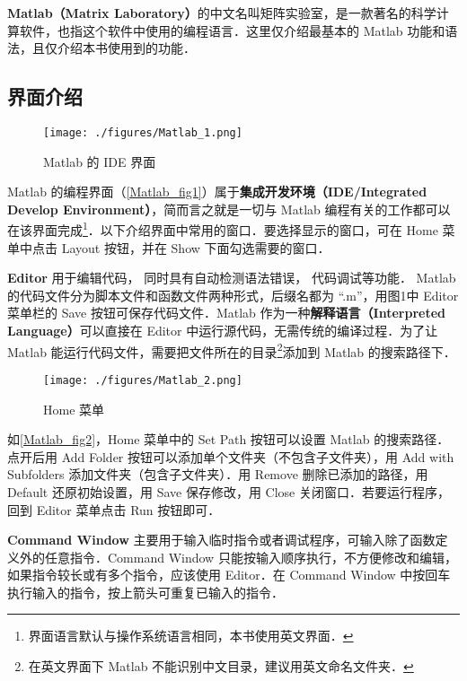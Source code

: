 
\textbf{Matlab（Matrix Laboratory）}的中文名叫矩阵实验室，是一款著名的科学计算软件，也指这个软件中使用的编程语言．这里仅介绍最基本的 Matlab 功能和语法，且仅介绍本书使用到的功能．


\subsection{界面介绍}

\begin{figure}[ht]
\centering
\texttt{[image: ./figures/Matlab\_1.png]}
\caption{Matlab 的 IDE 界面}\label{Matlab_fig1}
\end{figure}

Matlab 的编程界面（\autoref{Matlab_fig1}）属于\textbf{集成开发环境（IDE/Integrated Develop Environment）}，简而言之就是一切与 Matlab 编程有关的工作都可以在该界面完成\footnote{界面语言默认与操作系统语言相同，本书使用英文界面．}．以下介绍界面中常用的窗口．要选择显示的窗口，可在 Home 菜单中点击 Layout 按钮，并在 Show 下面勾选需要的窗口．

\textbf{Editor} 用于编辑代码， 同时具有自动检测语法错误， 代码调试等功能． Matlab 的代码文件分为脚本文件和函数文件两种形式，后缀名都为 “.m”，用图1中 Editor 菜单栏的 Save 按钮可保存代码文件．Matlab 作为一种\textbf{解释语言（Interpreted Language）}可以直接在 Editor 中运行源代码，无需传统的编译过程．为了让 Matlab 能运行代码文件，需要把文件所在的目录\footnote{在英文界面下 Matlab 不能识别中文目录，建议用英文命名文件夹．}添加到 Matlab 的搜索路径下．

\begin{figure}[ht]
\centering
\texttt{[image: ./figures/Matlab\_2.png]}
\caption{Home 菜单}\label{Matlab_fig2}
\end{figure}

如\autoref{Matlab_fig2}，Home 菜单中的 Set Path 按钮可以设置 Matlab 的搜索路径．点开后用 Add Folder 按钮可以添加单个文件夹（不包含子文件夹），用 Add with Subfolders 添加文件夹（包含子文件夹）．用 Remove 删除已添加的路径，用 Default 还原初始设置，用 Save 保存修改，用 Close 关闭窗口．若要运行程序，回到 Editor 菜单点击 Run 按钮即可．

\textbf{Command Window} 主要用于输入临时指令或者调试程序，可输入除了函数定义外的任意指令．Command Window 只能按输入顺序执行，不方便修改和编辑，如果指令较长或有多个指令，应该使用 Editor．在 Command Window 中按回车执行输入的指令，按上箭头可重复已输入的指令．

